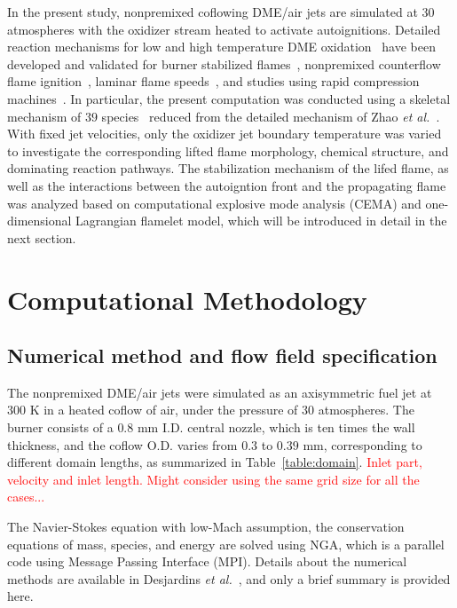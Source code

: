 \documentclass[review,3p,times]{elsarticleUS}
\begin{document}
In the present study, nonpremixed coflowing DME/air jets are simulated at 30 atmospheres with the oxidizer stream heated to activate autoignitions.  Detailed reaction mechanisms for low and high temperature DME oxidation~\cite{curran98,fischer00,curran00,zhao08} have been developed and validated for burner stabilized flames~\cite{kaiser00}, nonpremixed counterflow flame ignition~\cite{zheng05}, laminar flame speeds~\cite{qin05}, and studies using rapid compression machines~\cite{mittal08}.  In particular, the present computation was conducted using a skeletal mechanism of $39$ species~\cite{bansal11} reduced from the detailed mechanism of Zhao \emph{et al.}~\cite{zhao08}.  With fixed jet velocities, only the oxidizer jet boundary temperature was varied to investigate the corresponding lifted flame morphology, chemical structure, and dominating reaction pathways.  The stabilization mechanism of the lifed flame, as well as the interactions between the autoigntion front and the propagating flame was analyzed based on computational explosive mode analysis (CEMA) and one-dimensional Lagrangian flamelet model, which will be introduced in detail in the next section. 


\section{Computational Methodology}
\subsection{Numerical method and flow field specification}

The nonpremixed DME/air jets were simulated as an axisymmetric fuel jet at $300$ K in a heated coflow of air, under the pressure of $30$ atmospheres.  The burner consists of a $0.8$ mm I.D. central nozzle, which is ten times the wall thickness, and the coflow O.D. varies from $0.3$ to $0.39$ mm, corresponding to different domain lengths, as summarized in Table~\ref{table:domain}.     \textcolor{red}{Inlet part, velocity and inlet length. Might consider using the same grid size for all the cases...}

The Navier-Stokes equation with low-Mach assumption, the conservation equations of mass, species, and energy are solved using NGA, which is a parallel code using Message Passing Interface (MPI).  Details about the numerical methods are available in Desjardins \emph{et al.}~\cite{desjardins08}, and only a brief summary is provided here.
\end{document}
